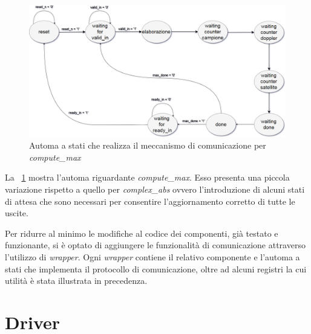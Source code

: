 \documentclass[12pt,a4paper,twoside,openany]{book}
\begin{document}
\clearpage
\begin{figure}
\begin{center}
\includegraphics[scale=0.31, keepaspectratio]{immagini/fsm_wrapper_max}
\caption{Automa a stati che realizza il meccanismo di comunicazione per \textit{compute\_max}}
\label{wrappermax_fsm}
\end{center}
\end{figure}

La \figurename~\ref{wrappermax_fsm} mostra l'automa riguardante \textit{compute\_max}. Esso presenta una piccola variazione rispetto a quello per \textit{complex\_abs} ovvero l'introduzione di alcuni stati di attesa che sono necessari per consentire l'aggiornamento corretto di tutte le uscite.

Per ridurre al minimo le modifiche al codice dei componenti, già testato e funzionante, si è optato di aggiungere le funzionalità di comunicazione attraverso l'utilizzo di \textit{wrapper}. Ogni \textit{wrapper} contiene il relativo componente e l'automa a stati che implementa il protocollo di comunicazione, oltre ad alcuni registri la cui utilità è stata illustrata in precedenza.

\chapter{Driver}
\end{document}
